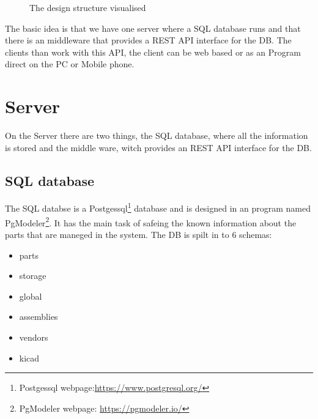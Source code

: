 \begin{figure}[h]
{%
	}
	\caption{The design structure visualised}
\end{figure}
The basic idea is that we have one server where a SQL database runs and that there is an middleware that provides a REST API interface for the DB. The clients than work with this API, the client can be web based or as an Program direct on the PC or Mobile phone.

\newpage
\section{Server}
On the Server there are two things, the SQL database, where all the information is stored and the middle ware, witch provides an REST API interface for the DB.

\subsection{SQL database}
The SQL databse is a Postgessql\footnote{Postgessql webpage:{\url{https://www.postgresql.org/}}} database and is designed in an program named PgModeler\footnote{PgModeler webpage: {\url{https://pgmodeler.io/}}}. It has the main task of safeing the known information about the parts that are maneged in the system.
\newline\newline
The DB is spilt in to 6 schemas:
\begin{itemize}
	\item parts
	\item storage
	\item global
	\item assemblies
	\item vendors
	\item kicad
\end{itemize}

